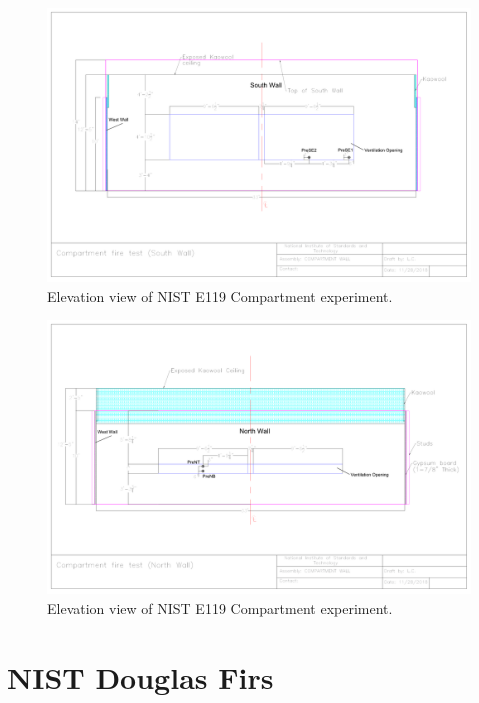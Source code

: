 \begin{figure}
\includegraphics[width=\textwidth]{FIGURES/NIST_E119_Compartment/NIST_E119_Compartment_SWall}
\caption[Elevation view of NIST E119 Compartment experiment]{Elevation view of NIST E119 Compartment experiment.}
\label{NIST_E119_Compartment_Drawing_2}
\end{figure}

\begin{figure}
\includegraphics[width=\textwidth]{FIGURES/NIST_E119_Compartment/NIST_E119_Compartment_NWall}
\caption[Elevation view of NIST E119 Compartment experiment]{Elevation view of NIST E119 Compartment experiment.}
\label{NIST_E119_Compartment_Drawing_3}
\end{figure}

\FloatBarrier

\section{NIST Douglas Firs}
\label{NIST_Douglas_Firs_Description}

